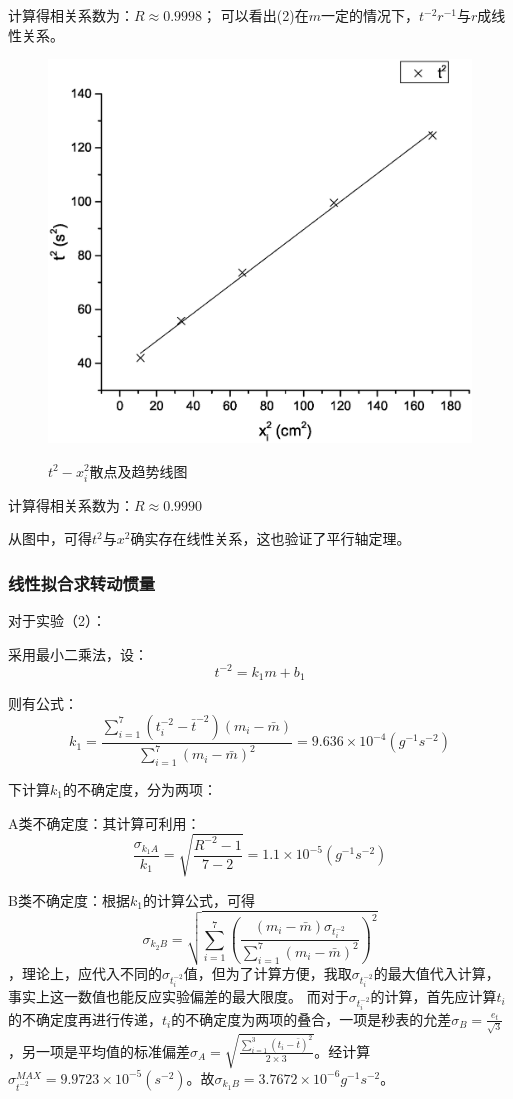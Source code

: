 \documentclass{ctexart}
\begin{document}
      计算得相关系数为：$R\approx0.9998$；     
      可以看出(2)在$m$一定的情况下，$t^{-2}r^{-1}$与$r$成线性关系。
      \begin{figure}[H]
        \centering
        \caption{$t^2-x_i^2$散点及趋势线图}
        \includegraphics[width=1.0\textwidth]{3}
        \label{fig:digit}
      \end{figure}
      计算得相关系数为：$R\approx0.9990$
      
      从图中，可得$t^2$与$x^2$确实存在线性关系，这也验证了平行轴定理。
      \subsubsection{线性拟合求转动惯量}
      对于实验（2）：

      采用最小二乘法，设：$$t^{-2}=k_1m+b_1$$
      
      则有公式：$$k_1=\frac{\sum\limits_{i=1}^7{(t_i^{-2}-\bar{t}^{-2})}(m_i-\bar{m})}{\sum\limits_{i=1}^7{(m_i-\bar{m})^2}}=9.636\times10^{-4}(g^{-1}s^{-2})$$

      下计算$k_1$的不确定度，分为两项：
      
      A类不确定度：其计算可利用：$$\frac{\sigma_{k_1A}}{k_1}=\sqrt{\frac{R^{-2}-1}{7-2}}=1.1\times10^{-5}(g^{-1}s^{-2})$$

      B类不确定度：根据$k_1$的计算公式，可得$$\sigma_{k_2B}=\sqrt{\sum\limits_{i=1}^7({\frac{(m_i-\bar{m})\sigma_{t^{-2}_i}}{\sum\limits_{i=1}^7{(m_i-\bar{m})^2}}})^2}$$，理论上，应代入不同的$\sigma_{t^{-2}_i}$值，但为了计算方便，我取$\sigma_{t_i^{-2}}$的最大值代入计算，事实上这一数值也能反应实验偏差的最大限度。
      而对于$\sigma_{t_i^{-2}}$的计算，首先应计算$t_i$的不确定度再进行传递，$t_i$的不确定度为两项的叠合，一项是秒表的允差$\sigma_B=\frac{e_t}{\sqrt{3}}$，另一项是平均值的标准偏差$\sigma_A=\sqrt{{\frac{\sum\limits_{i=1}^3(t_i-\bar{t})^2}{2\times3}}}$。经计算$\sigma_{t^{-2}}^{MAX}=9.9723\times10^{-5}(s^{-2})$。故$\sigma_{k_1B}=3.7672\times10^{-6}{g^{-1}s^{-2}}$。
\end{document}

